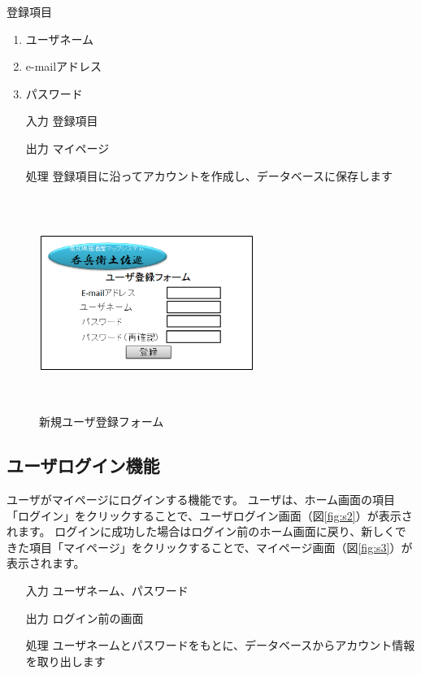 \documentclass[a4j,titlepage]{jarticle}
\begin{document}
登録項目
\begin{enumerate}
  \item ユーザネーム
  \item e-mailアドレス
  \item パスワード
\end{enumerate}

\begin{enumerate}
  \item [入力] 登録項目
  \item [出力] マイページ
  \item [処理] 登録項目に沿ってアカウントを作成し、データベースに保存します
\end{enumerate}

\begin{figure}[htbp]
  \begin{center}
  \includegraphics [height=7cm, width=7cm]{extrnal1_design_document_image/s1.eps}
  \caption{新規ユーザ登録フォーム}
  \label {fig:s1}
  \end{center}
\end{figure}

\newpage
\subsection{ユーザログイン機能}
ユーザがマイページにログインする機能です。
ユーザは、ホーム画面の項目「ログイン」をクリックすることで、ユーザログイン画面（図\ref{fig:s2}）が表示されます。
ログインに成功した場合はログイン前のホーム画面に戻り、新しくできた項目「マイページ」をクリックすることで、マイページ画面（図\ref{fig:s3}）が表示されます。

\begin{enumerate}
  \item [入力] ユーザネーム、パスワード
  \item [出力] ログイン前の画面
  \item [処理] ユーザネームとパスワードをもとに、データベースからアカウント情報を取り出します
\end{enumerate}
\end{document}

